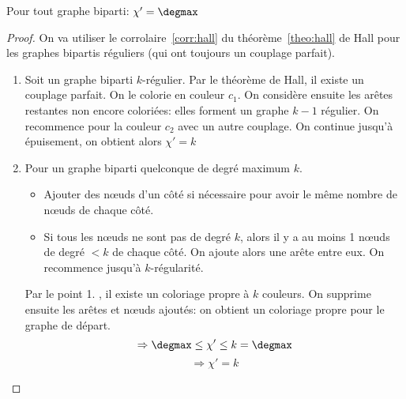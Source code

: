 \begin{mytheo}[König]
  Pour tout graphe biparti: $\chi '= \degmax$
  \begin{proof}
    On va utiliser le corrolaire~\ref{corr:hall} du théorème~\ref{theo:hall} de Hall
    pour les graphes bipartis réguliers (qui ont toujours un couplage parfait).
    \begin{enumerate}
      \item Soit un graphe biparti $k$-régulier. Par le théorème de Hall, il existe un couplage parfait. On le colorie en couleur $c_{1}$. On considère ensuite les arêtes restantes non encore coloriées: elles forment un graphe $k-1$ régulier. On recommence pour la couleur $c_{2}$ avec un autre couplage. On continue jusqu'à épuisement, on obtient alors $\chi '=k$
      \item Pour un graphe biparti quelconque de degré maximum $k$.
        \begin{itemize}
          \item Ajouter des nœuds d'un côté si nécessaire pour avoir le même nombre de nœuds de chaque côté.
          \item Si tous les nœuds ne sont pas de degré $k$, alors il y a au moins 1 nœuds de degré $<k$ de chaque côté.
            On ajoute alors une arête entre eux. On recommence jusqu'à $k$-régularité.
        \end{itemize}
        Par le point 1. , il existe un coloriage propre à $k$ couleurs. On supprime ensuite les arêtes et nœuds ajoutés: on obtient un coloriage propre pour le graphe de départ.
        $$\Rightarrow \degmax \le \chi ' \le k = \degmax$$
        $$\Rightarrow \chi ' = k$$
    \end{enumerate}
  \end{proof}
\end{mytheo}


